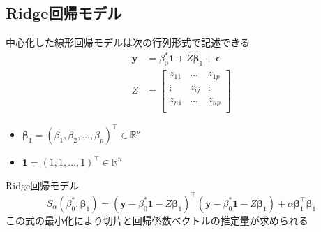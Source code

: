 \documentclass[dvipdfmx, 10pt]{beamer}
\begin{document}
\subsection{Ridge回帰モデル}
\begin{frame}{\insertsubsection}
    中心化した線形回帰モデルは次の行列形式で記述できる
    \begin{equation}
	\begin{split}
		\bm{y} &= \beta_0^* \bm{1} + Z \bm{\beta}_1 + \bm{\epsilon}\\
		Z &= \left[
                \begin{array}{ccc}
                z_{11} & \dots & z_{1p} \\
                \vdots & z_{ij} & \vdots \\
                z_{n1} & \dots & z_{np} \\
                \end{array}
                \right]
        \end{split}
	\label{eq:linear_model_mat}
    \end{equation}
    \begin{itemize}
    	\item $\bm{\beta}_1 = (\beta_1, \beta_2, \dots , \beta_p)^{\top} \in \mathbb{R}^p$
	\item $ \bm{1} = (1, 1, \dots , 1)^{\top} \in \mathbb{R}^n$
    \end{itemize}
    \vspace{10pt}
    Ridge回帰モデル
    \begin{equation}
        	S_{\alpha}(\beta_0^* , \bm{\beta}_1) = (\bm{y} - \beta_0^* \bm{1} - Z \bm{\beta}_1)^{\top} (\bm{y} - \beta_0^* \bm{1} - Z \bm{\beta}_1) + \alpha \bm{\beta}_1^{\top} \bm{\beta}_1 
    	\label{eq:ridge_estimate}
    \end{equation}
    \vspace{10pt}
    この式の最小化により切片と回帰係数ベクトルの推定量が求められる
\end{frame}
\end{document}
